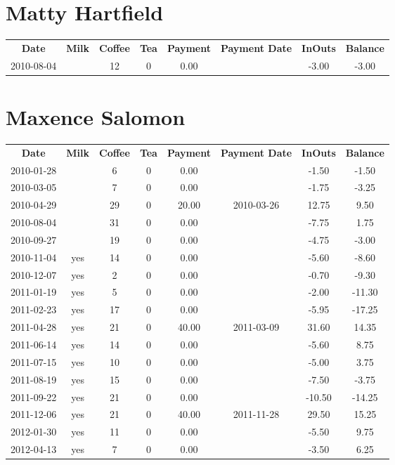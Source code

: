 \section{Matty Hartfield}

\begin{center}
\begin{tabular}{cccccccc}
\textbf{Date} & \textbf{Milk} & \textbf{Coffee} & \textbf{Tea} & \textbf{Payment} & \textbf{Payment Date} & \textbf{InOuts} & \textbf{Balance} \\
2010-08-04 &  & 12 & 0 & 0.00 &  & -3.00 & -3.00
\end{tabular}
\end{center}

\section{Maxence Salomon}

\begin{center}
\begin{tabular}{cccccccc}
\textbf{Date} & \textbf{Milk} & \textbf{Coffee} & \textbf{Tea} & \textbf{Payment} & \textbf{Payment Date} & \textbf{InOuts} & \textbf{Balance} \\
2010-01-28 &  &  6 & 0 &  0.00 &  &  -1.50 &  -1.50\\ 
2010-03-05 &  &  7 & 0 &  0.00 &  &  -1.75 &  -3.25\\ 
2010-04-29 &  & 29 & 0 & 20.00 & 2010-03-26 &  12.75 &   9.50\\ 
2010-08-04 &  & 31 & 0 &  0.00 &  &  -7.75 &   1.75\\ 
2010-09-27 &  & 19 & 0 &  0.00 &  &  -4.75 &  -3.00\\ 
2010-11-04 & yes & 14 & 0 &  0.00 &  &  -5.60 &  -8.60\\ 
2010-12-07 & yes &  2 & 0 &  0.00 &  &  -0.70 &  -9.30\\ 
2011-01-19 & yes &  5 & 0 &  0.00 &  &  -2.00 & -11.30\\ 
2011-02-23 & yes & 17 & 0 &  0.00 &  &  -5.95 & -17.25\\ 
2011-04-28 & yes & 21 & 0 & 40.00 & 2011-03-09 &  31.60 &  14.35\\ 
2011-06-14 & yes & 14 & 0 &  0.00 &  &  -5.60 &   8.75\\ 
2011-07-15 & yes & 10 & 0 &  0.00 &  &  -5.00 &   3.75\\ 
2011-08-19 & yes & 15 & 0 &  0.00 &  &  -7.50 &  -3.75\\ 
2011-09-22 & yes & 21 & 0 &  0.00 &  & -10.50 & -14.25\\ 
2011-12-06 & yes & 21 & 0 & 40.00 & 2011-11-28 &  29.50 &  15.25\\ 
2012-01-30 & yes & 11 & 0 &  0.00 &  &  -5.50 &   9.75\\ 
2012-04-13 & yes &  7 & 0 &  0.00 &  &  -3.50 &   6.25
\end{tabular}
\end{center}


